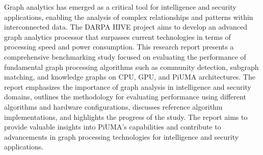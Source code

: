 \documentclass[letterpaper, 10pt]{article}
\begin{document}
\abstractname{}
\newline\par
\setlength{\parindent}{20pt}
Graph analytics has emerged as a critical tool for intelligence and security applications, enabling the analysis of complex relationships and patterns within interconnected data. The DARPA HIVE project aims to develop an advanced graph analytics processor that surpasses current technologies in terms of processing speed and power consumption. This research report presents a comprehensive benchmarking study focused on evaluating the performance of fundamental graph processing algorithms such as community detection, subgraph matching, and knowledge graphs on CPU, GPU, and PiUMA architectures. The report emphasizes the importance of graph analysis in intelligence and security domains, outlines the methodology for evaluating performance using different algorithms and hardware configurations, discusses reference algorithm implementations, and highlights the progress of the study. The report aims to provide valuable insights into PiUMA's capabilities and contribute to advancements in graph processing technologies for intelligence and security applications.
\end{document}
